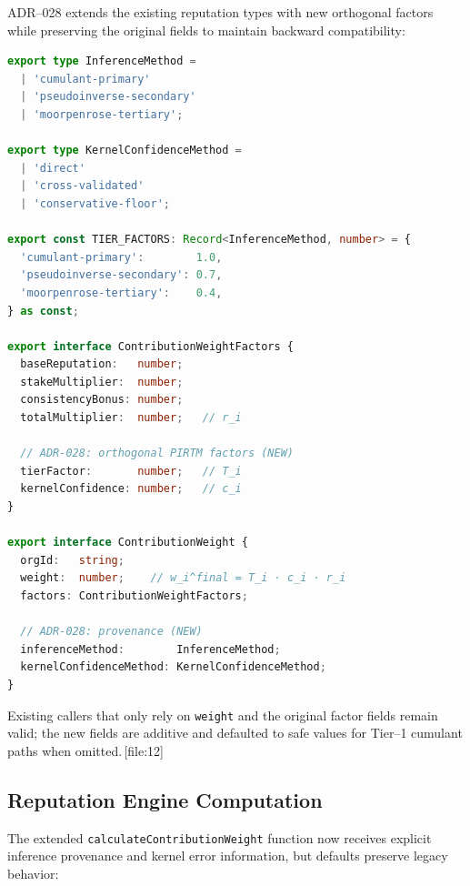 \documentclass[11pt]{article}
\begin{document}
ADR--028 extends the existing reputation types with new orthogonal factors
while preserving the original fields to maintain backward compatibility:

\begin{lstlisting}[language=TypeScript,caption={ADR--028 extensions to \texttt{ContributionWeightFactors} and related types.}]
export type InferenceMethod =
  | 'cumulant-primary'
  | 'pseudoinverse-secondary'
  | 'moorpenrose-tertiary';

export type KernelConfidenceMethod =
  | 'direct'
  | 'cross-validated'
  | 'conservative-floor';

export const TIER_FACTORS: Record<InferenceMethod, number> = {
  'cumulant-primary':        1.0,
  'pseudoinverse-secondary': 0.7,
  'moorpenrose-tertiary':    0.4,
} as const;

export interface ContributionWeightFactors {
  baseReputation:   number;
  stakeMultiplier:  number;
  consistencyBonus: number;
  totalMultiplier:  number;   // r_i

  // ADR-028: orthogonal PIRTM factors (NEW)
  tierFactor:       number;   // T_i
  kernelConfidence: number;   // c_i
}

export interface ContributionWeight {
  orgId:   string;
  weight:  number;    // w_i^final = T_i · c_i · r_i
  factors: ContributionWeightFactors;

  // ADR-028: provenance (NEW)
  inferenceMethod:        InferenceMethod;
  kernelConfidenceMethod: KernelConfidenceMethod;
}
\end{lstlisting}

Existing callers that only rely on \texttt{weight} and the original factor
fields remain valid; the new fields are additive and defaulted to safe
values for Tier--1 cumulant paths when omitted.\,[file:12]

\subsection{Reputation Engine Computation}

The extended \texttt{calculateContributionWeight} function now receives
explicit inference provenance and kernel error information, but defaults
preserve legacy behavior:
\end{document}
